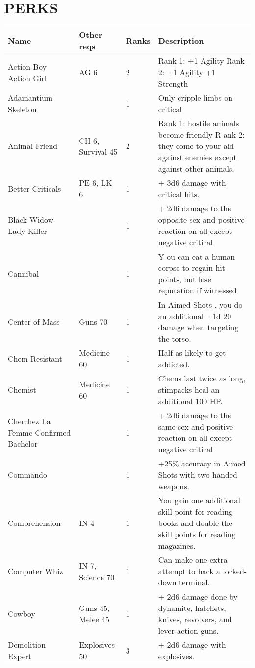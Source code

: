 \documentclass{report}
\begin{document}
\chapter{PERKS}
\begin{table}[H]
  \centering
  \begin{tabular}{p{30mm}p{30mm}p{30mm}p{30mm}}
\bfseries Name & \bfseries Other reqs & \bfseries Ranks & \bfseries Description \\
\hline
Action Boy Action Girl  & AG 6  & 2  & Rank 1: +1 Agility Rank 2: +1 Agility +1 Strength \\
Adamantium Skeleton  &  & 1  & Only cripple limbs on critical \\
Animal Friend  & CH 6, Survival 45  & 2  & Rank 1:  hostile animals become friendly R ank  2:  they come to your aid against enemies except against other animals.  \\
Better Criticals  & PE 6, LK 6  & 1  & + 3d6  damage with critical hits.  \\
Black Widow Lady Killer  &  & 1  & + 2d6  damage to the opposite sex and  positive reaction on all except negative critical \\
Cannibal  &  & 1  & Y ou  can  eat a human corpse to regain hit points, but lose  reputation if witnessed   \\
Center of Mass  & Guns 70  & 1  & In  Aimed Shots , you do an additional  +1d 20  damage when targeting the torso.  \\
Chem Resistant  & Medicine 60  & 1  & Half as likely to get addicted.  \\
Chemist  & Medicine 60  & 1  & Chems last twice as long,  stimpacks heal an additional 100 HP.   \\
Cherchez La Femme Confirmed Bachelor  &  & 1  & + 2d6  damage to the  same  sex and  positive reaction on all except negative critical \\
Commando  &  & 1  & +25\% accuracy in  Aimed Shots  with two-handed weapons.  \\
Comprehension  & IN 4  & 1  & You gain one additional skill point for reading books and double the skill points for reading magazines.  \\
Computer Whiz  & IN 7, Science 70  & 1  & Can make one extra attempt to hack a locked-down terminal.  \\
Cowboy  & Guns 45, Melee 45  & 1  & + 2d6  damage done by dynamite, hatchets, knives, revolvers, and lever-action guns.  \\
Demolition Expert  & Explosives 50  & 3  & + 2d6  damage with explosives.  \\

\end{tabular}
\end{table}
\end{document}
